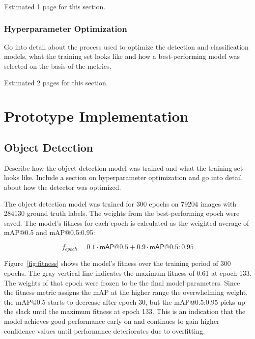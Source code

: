\documentclass[draft,final]{vutinfth} %
\begin{document}
Estimated 1 page for this section.

\subsection{Hyperparameter Optimization}
\label{sec:methods-hypopt}

Go into detail about the process used to optimize the detection and
classification models, what the training set looks like and how a
best-performing model was selected on the basis of the metrics.

Estimated 2 pages for this section.

\chapter{Prototype Implementation}
\label{chap:implementation}

\section{Object Detection}
\label{sec:development-detection}

Describe how the object detection model was trained and what the
training set looks like. Include a section on hyperparameter
optimization and go into detail about how the detector was optimized.

The object detection model was trained for 300 epochs on 79204 images
with 284130 ground truth labels. The weights from the best-performing
epoch were saved. The model's fitness for each epoch is calculated as
the weighted average of \textsf{mAP}@0.5 and \textsf{mAP}@0.5:0.95:

\begin{equation}
  \label{eq:fitness}
  f_{epoch} = 0.1 \cdot \mathsf{mAP}@0.5 + 0.9 \cdot \mathsf{mAP}@0.5\mathrm{:}0.95
\end{equation}

Figure~\ref{fig:fitness} shows the model's fitness over the training
period of 300 epochs. The gray vertical line indicates the maximum
fitness of 0.61 at epoch 133. The weights of that epoch were frozen to
be the final model parameters. Since the fitness metric assigns the
\textsf{mAP} at the higher range the overwhelming weight, the
\textsf{mAP}@0.5 starts to decrease after epoch 30, but the
\textsf{mAP}@0.5:0.95 picks up the slack until the maximum fitness at
epoch 133. This is an indication that the model achieves good
performance early on and continues to gain higher confidence values
until performance deteriorates due to overfitting.
\end{document}
